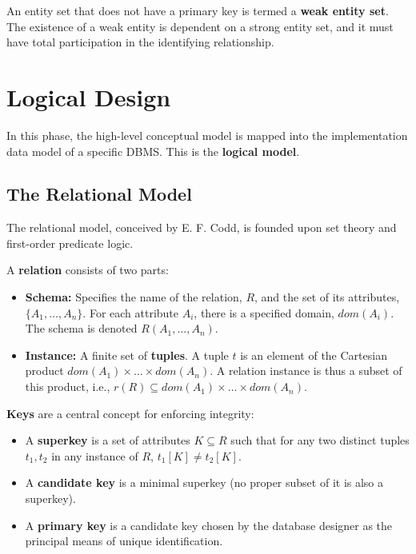 An entity set that does not have a primary key is termed a \textbf{weak entity set}. The existence of a weak entity is dependent on a strong entity set, and it must have total participation in the identifying relationship.

\section{Logical Design}

In this phase, the high-level conceptual model is mapped into the implementation data model of a specific DBMS. This is the \textbf{logical model}.

\subsection{The Relational Model}
The relational model, conceived by E. F. Codd, is founded upon set theory and first-order predicate logic.

\begin{definition}[Relation]
A \textbf{relation} consists of two parts:
\begin{itemize}
    \item \textbf{Schema:} Specifies the name of the relation, $R$, and the set of its attributes, $\{A_1, \dots, A_n\}$. For each attribute $A_i$, there is a specified domain, $dom(A_i)$. The schema is denoted $R(A_1, \dots, A_n)$.
    \item \textbf{Instance:} A finite set of \textbf{tuples}. A tuple $t$ is an element of the Cartesian product $dom(A_1) \times \dots \times dom(A_n)$. A relation instance is thus a subset of this product, i.e., $r(R) \subseteq dom(A_1) \times \dots \times dom(A_n)$.
\end{itemize}
\end{definition}

\noindent\textbf{Keys} are a central concept for enforcing integrity:
\begin{itemize}
    \item A \textbf{superkey} is a set of attributes $K \subseteq R$ such that for any two distinct tuples $t_1, t_2$ in any instance of $R$, $t_1[K] \neq t_2[K]$.
    \item A \textbf{candidate key} is a minimal superkey (no proper subset of it is also a superkey).
    \item A \textbf{primary key} is a candidate key chosen by the database designer as the principal means of unique identification.
\end{itemize}

